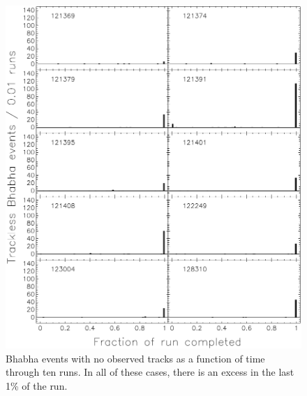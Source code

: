 \documentclass{cornell}
\begin{document}
\begin{figure}[p]
  \begin{center}
    \includegraphics[width=0.95\linewidth]{plots/crashruns2}
  \end{center}
  \caption[Ten runs in which the trackless Bhabha fraction increased
  at the end of the run]{\label{crashruns2} Bhabha events with no
  observed tracks as a function of time through ten runs.  In all of
  these cases, there is an excess in the last 1\% of the run.}
\end{figure}
\end{document}
